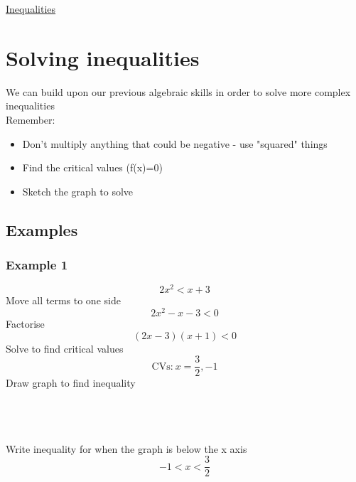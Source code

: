 \documentclass{article}[18pt]
\begin{document}
\begin{center}
\underline{\huge Inequalities}
\end{center}
\section{Solving inequalities}
We can build upon our previous algebraic skills in order to solve more complex inequalities\\
Remember:
\begin{itemize}
\item Don't multiply anything that could be negative - use "squared" things
\item Find the critical values (f(x)=0)
\item Sketch the graph to solve
\end{itemize}
\subsection{Examples}
\subsubsection{Example 1}
$$2x^2<x+3$$
Move all terms to one side
$$2x^2-x-3<0$$
Factorise
$$(2x-3)(x+1)<0$$
Solve to find critical values
$$\textrm{CVs:} \ x=\frac{3}{2},-1$$
Draw graph to find inequality\\
\\
\\
\\
Write inequality for when the graph is below the x axis
$$-1<x<\frac{3}{2}$$
\newpage
\end{document}
